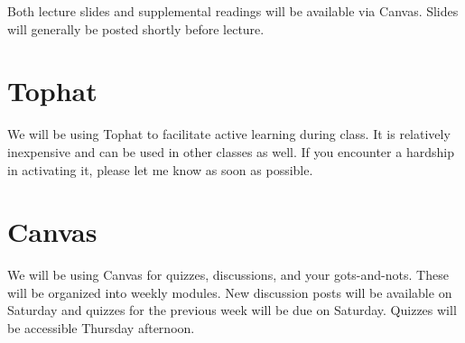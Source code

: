 \documentclass[11pt,]{article}
\begin{document}
Both lecture slides and supplemental readings will be available via
Canvas. Slides will generally be posted shortly before lecture.

\hypertarget{tophat}{%
\section{Tophat}\label{tophat}}

We will be using Tophat to facilitate active learning during class. It
is relatively inexpensive and can be used in other classes as well. If
you encounter a hardship in activating it, please let me know as soon as
possible.

\hypertarget{canvas}{%
\section{Canvas}\label{canvas}}

We will be using Canvas for quizzes, discussions, and your
gots-and-nots. These will be organized into weekly modules. New
discussion posts will be available on Saturday and quizzes for the
previous week will be due on Saturday. Quizzes will be accessible
Thursday afternoon.

\newpage
\end{document}
